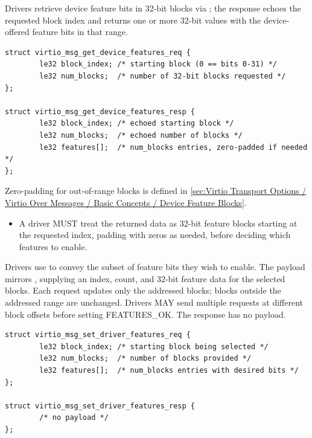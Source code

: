 
Drivers retrieve device feature bits in 32-bit blocks via
; the response echoes the requested block index and
returns one or more 32-bit values with the device-offered feature bits in that
range.

\begin{lstlisting}
struct virtio_msg_get_device_features_req {
        le32 block_index; /* starting block (0 == bits 0-31) */
        le32 num_blocks;  /* number of 32-bit blocks requested */
};

struct virtio_msg_get_device_features_resp {
        le32 block_index; /* echoed starting block */
        le32 num_blocks;  /* echoed number of blocks */
        le32 features[];  /* num_blocks entries, zero-padded if needed */
};
\end{lstlisting}

Zero-padding for out-of-range blocks is defined in
\ref{sec:Virtio Transport Options / Virtio Over Messages / Basic Concepts / Device Feature Blocks}.

\begin{itemize}
  \item A driver MUST treat the returned data as 32-bit feature blocks starting
        at the requested index, padding with zeros as needed, before deciding
        which features to enable.
\end{itemize}


Drivers use  to convey the subset of feature
bits they wish to enable. The payload mirrors ,
supplying an index, count, and 32-bit feature data for the selected blocks.
Each  request updates only the addressed blocks;
blocks outside the addressed range are unchanged. Drivers MAY send multiple
 requests at different block offsets before setting
FEATURES\_OK. The response has no payload.

\begin{lstlisting}
struct virtio_msg_set_driver_features_req {
        le32 block_index; /* starting block being selected */
        le32 num_blocks;  /* number of blocks provided */
        le32 features[];  /* num_blocks entries with desired bits */
};

struct virtio_msg_set_driver_features_resp {
        /* no payload */
};
\end{lstlisting}

